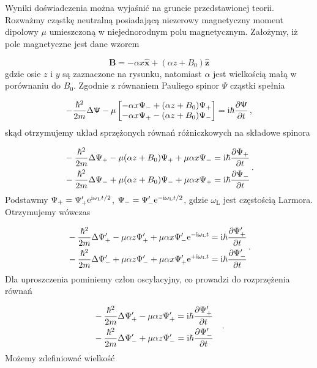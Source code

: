 \documentclass{myclass}
\begin{document}
Wyniki doświadczenia można wyjaśnić na gruncie przedstawionej teorii. Rozważmy cząstkę neutralną
posiadającą niezerowy magnetyczny moment dipolowy \(\mu\) umieszczoną w niejednorodnym polu
magnetycznym. Założymy, iż pole magnetyczne jest dane wzorem

\begin{equation*}
\mathbf{B}=-\alpha x\mathbf{\hat{x}}+(\alpha z+B_0)\mathbf{\hat{z}}
\end{equation*}
gdzie osie \(z\) i \(y\) są zaznaczone na rysunku, natomiast \(\alpha\) jest wielkością małą w
porównaniu do \(B_0\). Zgodnie z równaniem Pauliego spinor \(\mathsf{\Psi}\) cząstki spełnia

\begin{equation*}
-\frac{\hbar^2}{2m}\Delta\mathsf{\Psi}-\mu\begin{bmatrix}
-\alpha x\Psi_-+(\alpha z+B_0)\Psi_+\\
-\alpha x\Psi_+-(\alpha z+B_0)\Psi_-
\end{bmatrix}=\mathrm{i}\hbar\pdv{\mathsf{\Psi}}{t}\,,
\end{equation*}
skąd otrzymujemy układ sprzężonych równań różniczkowych na składowe spinora

\begin{equation*}
\begin{split}
    & -\frac{\hbar^2}{2m}\Delta\Psi_+-\mu(\alpha z+B_0)\Psi_++\mu\alpha x\Psi_-=\mathrm{i}\hbar\pdv{\Psi_+}{t}\\
    & -\frac{\hbar^2}{2m}\Delta\Psi_-+\mu(\alpha z+B_0)\Psi_-+\mu\alpha x\Psi_+=\mathrm{i}\hbar\pdv{\Psi_-}{t}
\end{split}\,.
\end{equation*}
Podstawmy \(\Psi_+=\Psi_+'\mathrm{e}^{\mathrm{i}\omega_\text{L}t/2}\),
\(\Psi_-=\Psi_-'\mathrm{e}^{-\mathrm{i}\omega_\text{L}t/2}\), gdzie \(\omega_\text{L}\) jest częstością Larmora.
Otrzymujemy wówczas

\begin{equation*}
\begin{split}
    &-\frac{\hbar^2}{2m}\Delta\Psi_+'-\mu\alpha z\Psi_+'+\mu\alpha x\Psi_-'\mathrm{e}^{-\mathrm{i}\omega_\text{L}t}=\mathrm{i}\hbar\pdv{\Psi_+'}{t}\\
    &-\frac{\hbar^2}{2m}\Delta\Psi_-'+\mu\alpha z\Psi_-'+\mu\alpha x\Psi_+'\mathrm{e}^{+\mathrm{i}\omega_\text{L}t}=\mathrm{i}\hbar\pdv{\Psi_-'}{t}
\end{split}\,.
\end{equation*}
Dla uproszczenia pominiemy człon oscylacyjny, co prowadzi do rozprzężenia równań

\begin{equation*}
\begin{split}
    &-\frac{\hbar^2}{2m}\Delta\Psi_+'-\mu\alpha z\Psi_+'=\mathrm{i}\hbar\pdv{\Psi_+'}{t}\\
    &-\frac{\hbar^2}{2m}\Delta\Psi_-'+\mu\alpha z\Psi_-'=\mathrm{i}\hbar\pdv{\Psi_-'}{t}
\end{split}\quad.
\end{equation*}
Możemy zdefiniować wielkość
\end{document}

